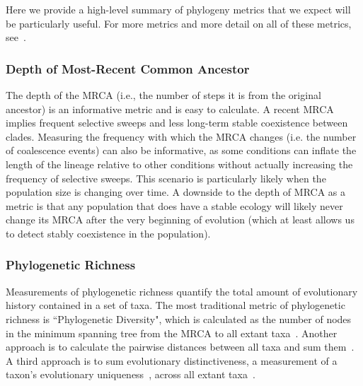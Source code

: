 \documentclass[letterpaper]{article}
\begin{document}
Here we provide a high-level summary of phylogeny metrics that we expect will be particularly useful. For more metrics and more detail on all of these metrics, see~\citep{winter_phylogenetic_2013, tucker_guide_2017}. 

\subsubsection{Depth of Most-Recent Common Ancestor}

The depth of the MRCA %
(i.e., the number of steps it is from the original ancestor)
is an informative metric and is easy to calculate.
A recent MRCA implies frequent selective sweeps and less long-term stable coexistence between clades. %
Measuring the frequency with which the MRCA changes (i.e. the number of coalescence events) can also be informative, as some conditions can inflate the length of the lineage relative to other conditions without actually increasing the frequency of selective sweeps. This scenario is particularly likely when the population size is changing over time. A downside to the depth of MRCA as a metric is that any population that does have a stable ecology will likely never change its MRCA after the very beginning of evolution %
(which at least allows us to detect stably coexistence in the population).

\subsubsection{Phylogenetic Richness}

Measurements of phylogenetic richness quantify the total amount of evolutionary history contained in a set of taxa. The most traditional metric of phylogenetic richness is
``Phylogenetic Diversity", which is calculated as the number of nodes in the minimum spanning tree from the MRCA to all extant taxa~\citep{faith_conservation_1992}. Another approach is to calculate the pairwise distances between all taxa and sum them~\citep{tucker_guide_2017}. A third approach is to sum evolutionary distinctiveness, a measurement of a taxon's evolutionary uniqueness~\citep{isaac_mammals_2007}, across all extant taxa~\citep{tucker_guide_2017}.
\end{document}
